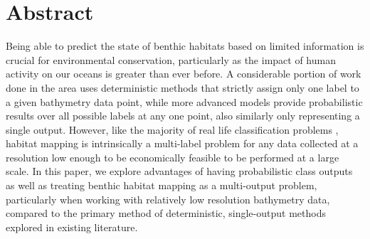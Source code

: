 \chapter*{Abstract}

Being able to predict the state of benthic habitats based on limited information is crucial for environmental conservation, particularly as the impact of human activity on our oceans is greater than ever before. A considerable portion of work done in the area uses deterministic methods that strictly assign only one label to a given bathymetry data point, while more advanced models provide probabilistic results over all possible labels at any one point, also similarly only representing a single output. However, like the majority of real life classification problems , habitat mapping is intrinsically a multi-label problem for any data collected at a resolution low enough to be economically feasible to be performed at a large scale. In this paper, we explore advantages of having probabilistic class outputs as well as treating benthic habitat mapping as a multi-output problem, particularly when working with relatively low resolution bathymetry data, compared to the primary method of deterministic, single-output methods explored in existing literature.
